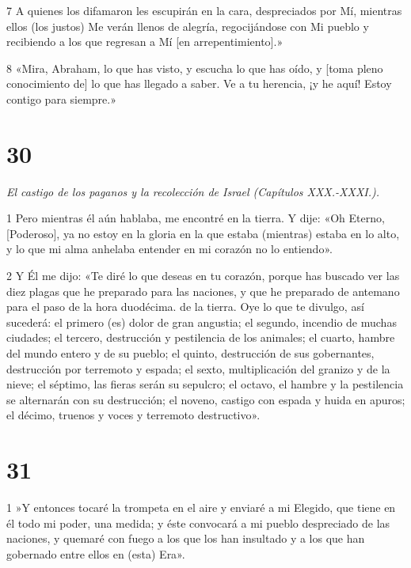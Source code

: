 \par 7 A quienes los difamaron les escupirán en la cara, despreciados por Mí, mientras ellos (los justos) Me verán llenos de alegría, regocijándose con Mi pueblo y recibiendo a los que regresan a Mí [en arrepentimiento].»

\par 8 «Mira, Abraham, lo que has visto, y escucha lo que has oído, y [toma pleno conocimiento de] lo que has llegado a saber. Ve a tu herencia, ¡y he aquí! Estoy contigo para siempre.»

\chapter{30}

\par \textit{El castigo de los paganos y la recolección de Israel (Capítulos XXX.-XXXI.).}

\par 1 Pero mientras él aún hablaba, me encontré en la tierra. Y dije: «Oh Eterno, [Poderoso], ya no estoy en la gloria en la que estaba (mientras) estaba en lo alto, y lo que mi alma anhelaba entender en mi corazón no lo entiendo».

\par 2 Y Él me dijo: «Te diré lo que deseas en tu corazón, porque has buscado ver las diez plagas que he preparado para las naciones, y que he preparado de antemano para el paso de la hora duodécima. de la tierra. Oye lo que te divulgo, así sucederá: el primero (es) dolor de gran angustia; el segundo, incendio de muchas ciudades; el tercero, destrucción y pestilencia de los animales; el cuarto, hambre del mundo entero y de su pueblo; el quinto, destrucción de sus gobernantes, destrucción por terremoto y espada; el sexto, multiplicación del granizo y de la nieve; el séptimo, las fieras serán su sepulcro; el octavo, el hambre y la pestilencia se alternarán con su destrucción; el noveno, castigo con espada y huida en apuros; el décimo, truenos y voces y terremoto destructivo».

\chapter{31}

\par 1 »Y entonces tocaré la trompeta en el aire y enviaré a mi Elegido, que tiene en él todo mi poder, una medida; y éste convocará a mi pueblo despreciado de las naciones, y quemaré con fuego a los que los han insultado y a los que han gobernado entre ellos en (esta) Era».

